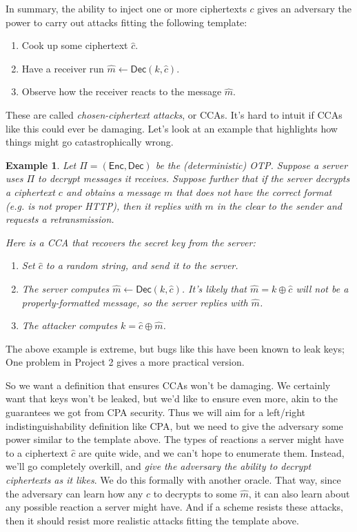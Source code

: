 \documentclass[11pt]{article}
\newtheorem{example}{Example}
\newcommand{\Enc}{\mathsf{Enc}}
\newcommand{\Dec}{\mathsf{Dec}}
\newcommand{\hatc}{\hat{c}}
\newcommand{\hatm}{\hat{m}}
\begin{document}
In summary, the ability to inject one or more ciphertexts $c$ gives an
adversary the power to carry out attacks fitting the following template:
\begin{enumerate}
    \item Cook up some ciphertext $\hatc$.
    \item Have a receiver run $\hatm \gets \Dec(k,\hatc)$.
    \item Observe how the receiver reacts to the message $\hatm$.
\end{enumerate}
These are called \emph{chosen-ciphertext attacks}, or CCAs.
It's hard to intuit if CCAs like this could ever be damaging. Let's look
at an example that highlights how things might go catastrophically wrong.
\begin{example}
    Let $\Pi = (\Enc,\Dec)$ be the (deterministic) OTP. Suppose a server
    uses $\Pi$ to decrypt messages it receives. 
    Suppose further that if the server decrypts a ciphertext
    $c$ and obtains a message $m$
    that does not have the correct format (e.g. is not proper
    HTTP), then it replies with $m$ in the clear to the sender and requests
    a retransmission.

    Here is a CCA that recovers the secret key from the server:
    \begin{enumerate}
        \item Set $\hatc$ to a random string, and send it to the server.
        \item The server computes $\hatm\gets\Dec(k,\hatc)$. It's likely
            that $\hatm=k\oplus \hatc$ will
            not be a properly-formatted message, so the server replies with
            $\hatm$.
        \item The attacker computes $k = \hatc\oplus\hatm$.
    \end{enumerate}
\end{example}
The above example is extreme, but bugs like this have been known to leak
keys; One problem in Project 2 gives a more practical version.


So we want a definition that ensures CCAs won't be damaging. We certainly want
that keys won't be leaked, but we'd like to ensure even more, akin to the
guarantees we got from CPA security. Thus we will aim for a left/right
indistinguishability definition like CPA, but we need to give the adversary
some power similar to the template above. The types of reactions a server might
have to a ciphertext $\hatc$ are quite wide, and we can't hope to enumerate
them. Instead, we'll go completely overkill, and \emph{give the adversary the
ability to decrypt ciphertexts as it likes}. We do this formally with another
oracle. That way, since the adversary can learn how any $\hatc$ to decrypts to
some $\hatm$, it can also learn about any possible reaction a server might
have. And if a scheme resists these attacks, then it should resist more
realistic attacks fitting the template above.
\end{document}
